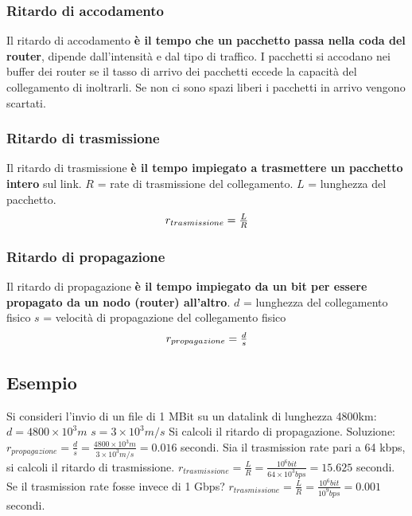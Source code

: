 \documentclass[11pt,a4paper]{article}
\theoremstyle{definition}
\begin{document}
\subsubsection{Ritardo di accodamento}
Il ritardo di accodamento \textbf{è il tempo che un pacchetto passa nella coda del router}, dipende dall'intensità e dal tipo di traffico. I pacchetti si accodano nei buffer dei router se il tasso di arrivo dei pacchetti eccede la capacità del collegamento di inoltrarli. Se non ci sono spazi liberi i pacchetti in arrivo vengono scartati.

\subsubsection{Ritardo di trasmissione}
Il ritardo di trasmissione \textbf{è il tempo impiegato a trasmettere un pacchetto intero} sul link.\newline
$R$ = rate di trasmissione del collegamento.\newline
$L$ = lunghezza del pacchetto.\newline
\[\centerline{$r_{trasmissione} = \frac{L}{R}$}\]
\subsubsection{Ritardo di propagazione}
Il ritardo di propagazione \textbf{è il tempo impiegato da un bit per essere propagato da un nodo (router) all'altro}.\newline
$d$ = lunghezza del collegamento fisico\newline
$s$ = velocità di propagazione del collegamento fisico \newline
\[\centerline{$r_{propagazione} = \frac{d}{s}$}\]

\subsection{Esempio}
Si consideri l'invio di un file di 1 MBit su un datalink di lunghezza 4800km:\newline
$d = 4800\times10^3 m$ \newline
$s = 3\times10^3 m/s$ \newline
Si calcoli il ritardo di propagazione. \newline
Soluzione:\newline\newline
$r_{propagazione} = \frac{d}{s} = \frac{4800\times10^3 m }{3\times10^3 m/s}  = 0.016$ secondi.\newline\newline
Sia il trasmission rate pari a 64 kbps, si calcoli il ritardo di trasmissione. \newline\newline
$r_{trasmissione} = \frac{L}{R} = \frac{10^6 bit}{64\times10^3 bps}= 15.625$ secondi.\newline\newline
Se il trasmission rate fosse invece di 1 Gbps? \newline\newline
$r_{trasmissione} = \frac{L}{R} = \frac{10^6 bit}{10^9 bps} = 0.001$ secondi.
\end{document}
